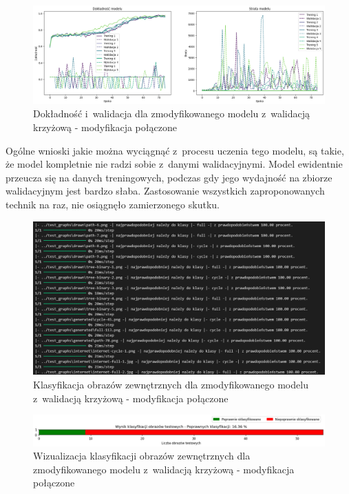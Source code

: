 \begin{figure}[ht]
	\centering
	\includegraphics[width=15.5cm]{resources/tests/images/v4/crossvalid_img.png}
	\caption{Dokładność i~walidacja dla zmodyfikowanego modelu z~walidacją krzyżową - modyfikacja połączone}
	\label{Fig:tests-cv-5a}
\end{figure}
\FloatBarrier

Ogólne wnioski jakie można wyciągnąć z~procesu uczenia tego modelu,
są takie, że model kompletnie nie radzi sobie z~danymi walidacyjnymi.
Model ewidentnie przeucza się na danych treningowych,
podczas gdy jego wydajność na zbiorze walidacyjnym jest bardzo słaba.
Zastosowanie wszystkich zaproponowanych technik na raz,
nie osiągnęło zamierzonego skutku. 

\begin{figure}[ht]
	\centering
	\includegraphics[width=15.5cm]{resources/tests/images/v4/crossvalid_txt.png}
	\caption{Klasyfikacja obrazów zewnętrznych dla zmodyfikowanego modelu z~walidacją krzyżową - modyfikacja połączone}
	\label{Fig:tests-cv-5b}
\end{figure}
\FloatBarrier

\begin{figure}[ht]
	\centering
	\includegraphics[width=15.5cm]{resources/tests/images/v4/crossvalid_bar.png}
	\caption{Wizualizacja klasyfikacji obrazów zewnętrznych dla zmodyfikowanego modelu z~walidacją krzyżową - modyfikacja połączone}
	\label{Fig:tests-cv-5c}
\end{figure}
\FloatBarrier

